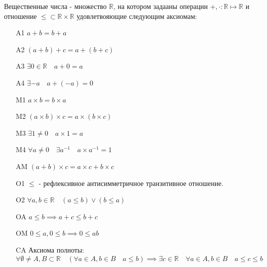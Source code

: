     \begin{definition} 
    Вещественные числа - множество $\mathbb{R}$, на котором задааны операции $+, \cdot : \mathbb{R} \mapsto \mathbb{R}$ и отношение $\le \subset \mathbb{R} \times \mathbb{R}$ удовлетвояющие следующим аксиомам:
        \begin{enumerate}
            \item[A1] $ a+b=b+a$
            \item[A2] $ \left( a+b \right) +c = a+\left( b+c \right)$
            \item[A3] $ \exists 0 \in \mathbb{R}\quad a + 0 = a$
            \item[A4] $\exists -a\quad a+(-a)=0$
            \item[M1] $ a\times b = b\times a$
            \item[M2] $ \left( a\times b \right) \times c = a \times \left( b \times c \right)$
            \item[M3] $ \exists 1\neq 0\quad a\times 1 = a$
            \item[M4] $ \forall{a \neq 0}\quad\exists a^{-1}\quad a\times a^{-1} = 1$
            \item[AM] $(a+b)\times c = a\times c+b\times c$
            \item[O1] $\le$ - рефлексивное антисимметричное транзитивное отношение.
            \item[O2] $\forall{a, b \in \mathbb{R}}\quad (a\le b)\lor (b\le a)$
            \item[OA] $a\le b \implies a + c \le b + c$
            \item[OM] $0 \le a, 0 \le b \implies 0 \le ab$
            \item[CA] Аксиома полноты:\\
                $\forall{\emptyset \neq A,B \subset \mathbb{R}}\quad \left( \forall{a\in A, b\in B}\quad a \le b \right) \implies \exists{c\in \mathbb{R}}\quad \forall{a\in A, b\in B}\quad a \le c \le b  $
        \end{enumerate}
    \end{definition}
